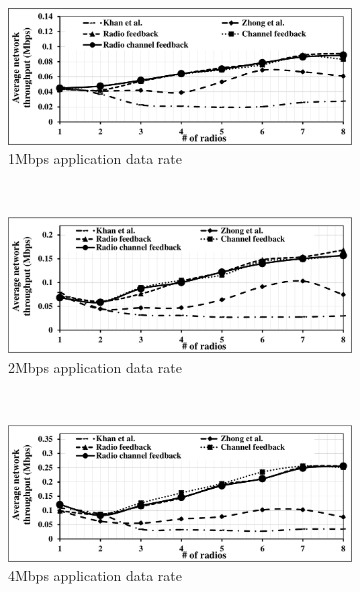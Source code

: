 \begin{landscape}
\begin{figure}[!htbp]
    \centering
    \begin{subfigure}[t]{0.625\textwidth}
        \includegraphics[width=\textwidth]{alltopology/32Throughput24d1}
        \caption{1Mbps application data rate}
    \end{subfigure}
    ~
    \begin{subfigure}[t]{0.625\textwidth}
        \includegraphics[width=\textwidth]{alltopology/32Throughput24d2}
        \caption{2Mbps application data rate}
    \end{subfigure}
    ~\\
    \begin{subfigure}[t]{0.625\textwidth}
        \includegraphics[width=\textwidth]{alltopology/32Throughput24d4}
        \caption{4Mbps application data rate}
    \end{subfigure}
    ~
    \begin{subfigure}[t]{0.625\textwidth}

\end{subfigure}
\end{figure}
\end{landscape}
